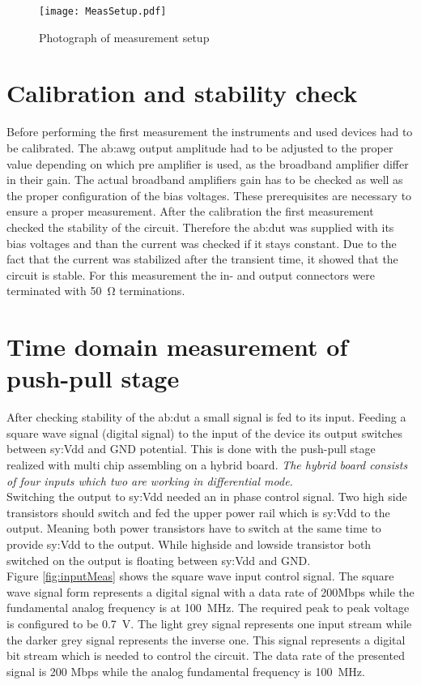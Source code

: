 \begin{figure}[htb!]
	\centering
  \texttt{[image: MeasSetup.pdf]}
	\caption{Photograph of measurement setup}
	\label{fig:PhotoMeasSetup}
\end{figure}

\section{Calibration and stability check}
Before performing the first measurement the instruments and used devices had to be calibrated.
The \gls{ab:awg} output amplitude had to be adjusted to the proper value depending on which pre amplifier is used, as the broadband amplifier differ in their gain.
The actual broadband amplifiers gain has to be checked as well as the proper configuration of the bias voltages.
These prerequisites are necessary to ensure a proper measurement.
After the calibration the first measurement checked the stability of the circuit.
Therefore the \gls{ab:dut} was supplied with its bias voltages and than the current was checked if it stays constant.
Due to the fact that the current was stabilized after the transient time, it showed that the circuit is stable.
For this measurement the in- and output connectors were terminated with \SI{50}{\ohm} terminations.


\section{Time domain measurement of push-pull stage}
After checking stability of the \gls{ab:dut} a small signal is fed to its input.
Feeding a square wave signal (digital signal) to the input of the device its output switches between \gls{sy:Vdd} and GND potential.
This is done with the push-pull stage realized with multi chip assembling on a hybrid board.
\textit{The hybrid board consists of four inputs which two are working in differential mode.}\\
Switching the output to \gls{sy:Vdd} needed an in phase control signal.
Two high side transistors should switch and fed the upper power rail which is \gls{sy:Vdd} to the output.
Meaning both power transistors have to switch at the same time to provide \gls{sy:Vdd} to the output.
While highside and lowside transistor both switched on the output is floating between \gls{sy:Vdd} and GND.\\
Figure \ref{fig:inputMeas} shows the square wave input control signal.
The square wave signal form represents a digital signal with a data rate of 200Mbps while the fundamental analog frequency is at \SI{100}{\mega \hertz}.
The required peak to peak voltage is configured to be \SI{0.7}{\volt}.
The light grey signal represents one input stream while the darker grey signal represents the inverse one.
This signal represents a digital bit stream which is needed to control the circuit.
The data rate of the presented signal is 200 Mbps while the analog fundamental frequency is \SI{100}{\mega\hertz}.

